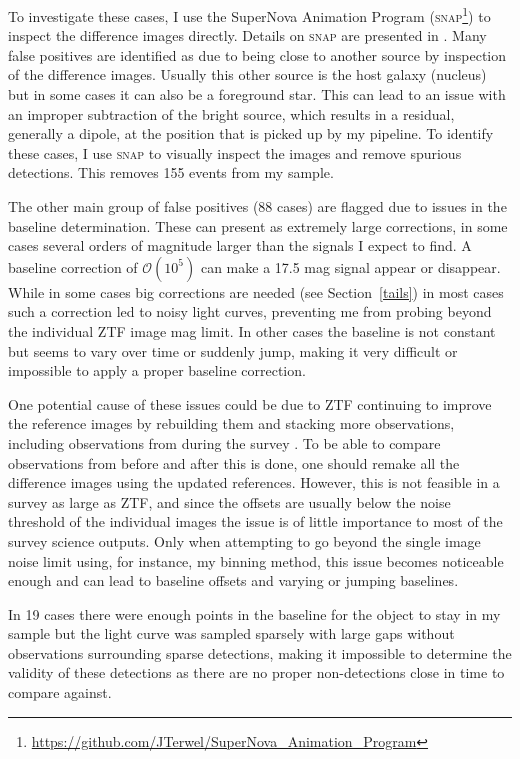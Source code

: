 \documentclass[a4paper,oneside,12pt, class=Latex/Classes/PhDthesisPSnPDF, crop=false]{standalone}
\begin{document}
To investigate these cases, I use the SuperNova Animation Program (\textsc{snap}\footnote{\url{https://github.com/JTerwel/SuperNova_Animation_Program}}) to inspect the difference images directly. Details on \textsc{snap} are presented in \citet{Terwel_2024_paper1}. Many false positives are identified as due to being close to another source by inspection of the difference images. Usually this other source is the host galaxy (nucleus) but in some cases it can also be a foreground star. This can lead to an issue with an improper subtraction of the bright source, which results in a residual, generally a dipole, at the position that is picked up by my pipeline. To identify these cases, I use \textsc{snap} to visually inspect the images and remove spurious detections. This removes 155  events from my sample. 

The other main group of false positives (88 cases) are flagged due to issues in the baseline determination. These can present as extremely large corrections, in some cases several orders of magnitude larger than the signals I expect to find. A baseline correction of $\mathcal{O}(10^5)$ can make a 17.5 mag signal appear or disappear. While in some cases big corrections are needed (see Section~\ref{tails}) in most cases such a correction led to noisy light curves, preventing me from probing beyond the individual ZTF image mag limit. In other cases the baseline is not constant but seems to vary over time or suddenly jump, making it very difficult or impossible to apply a proper baseline correction.

One potential cause of these issues could be due to ZTF continuing to improve the reference images by rebuilding them and stacking more observations, including observations from during the survey \citep{ZTF_Instrumentation}. To be able to compare observations from before and after this is done, one should remake all the difference images using the updated references. However, this is not feasible in a survey as large as ZTF, and since the offsets are usually below the noise threshold of the individual images the issue is of little importance to most of the survey science outputs. Only when attempting to go beyond the single image noise limit using, for instance, my binning method, this issue becomes noticeable enough and can lead to baseline offsets and varying or jumping baselines.

In 19 cases there were enough points in the baseline for the object to stay in my sample but the light curve was sampled sparsely with large gaps without observations surrounding sparse detections, making it impossible to determine the validity of these detections as there are no proper non-detections close in time to compare against.
\end{document}
